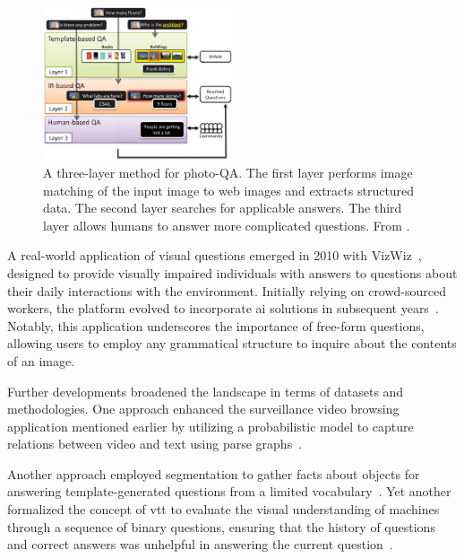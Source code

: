\begin{figure}[!ht]
\begin{center}
\includegraphics[width=0.5\textwidth]{Figures/Introduction/photo_qa.png}
\caption{A three-layer method for photo-QA. The first layer performs image matching of the input image to web images and extracts structured data. The second layer searches for applicable answers. The third layer allows humans to answer more complicated questions. From \cite{yeh2008photo}.}
\label{fig:photo_qa}
\end{center}
\end{figure}

A real-world application of visual questions emerged in 2010 with VizWiz~\cite{bigham2010vizwiz}, designed to provide visually impaired individuals with answers to questions about their daily interactions with the environment. Initially relying on crowd-sourced workers, the platform evolved to incorporate \gls{ai} solutions in subsequent years~\cite{gurari2018vizwiz,gurari2019vizwiz}. Notably, this application underscores the importance of free-form questions, allowing users to employ any grammatical structure to inquire about the contents of an image.

Further developments broadened the landscape in terms of datasets and methodologies. One approach enhanced the surveillance video browsing application mentioned earlier by utilizing a probabilistic model to capture relations between video and text using parse graphs~\cite{tu2014joint}. 

Another approach employed segmentation to gather facts about objects for answering template-generated questions from a limited vocabulary~\cite{malinowski2014multi}. Yet another formalized the concept of \gls{vtt} to evaluate the visual understanding of machines through a sequence of binary questions, ensuring that the history of questions and correct answers was unhelpful in answering the current question~\cite{geman2015visual}.

